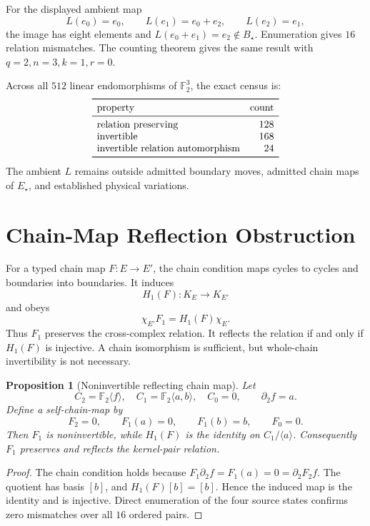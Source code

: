 \documentclass[11pt]{article}
\newtheorem{proposition}{Proposition}
\newcommand{\Ftwo}{\mathbb F_2}
\begin{document}
For the displayed ambient map
\[
L(e_0)=e_0,\qquad L(e_1)=e_0+e_2,\qquad L(e_2)=e_1,
\]
the image has eight elements and \(L(e_0+e_1)=e_2\notin B_\star\).
Enumeration gives \(16\) relation mismatches. The counting theorem gives the
same result with \(q=2,n=3,k=1,r=0\).

Across all \(512\) linear endomorphisms of \(\Ftwo^3\), the exact census is:
\[
\begin{array}{lr}
\toprule
\text{property}&\text{count}\\
\midrule
\text{relation preserving}&128\\
\text{invertible}&168\\
\text{invertible relation automorphism}&24\\
\bottomrule
\end{array}
\]
The ambient \(L\) remains outside admitted boundary moves, admitted chain
maps of \(E_\star\), and established physical variations.

\section{Chain-Map Reflection Obstruction}

For a typed chain map \(F:E\to E'\), the chain condition maps cycles to
cycles and boundaries into boundaries. It induces
\[
H_1(F):K_E\to K_{E'}
\]
and obeys
\[
\chi_{E'}F_1=H_1(F)\chi_E.
\]
Thus \(F_1\) preserves the cross-complex relation. It reflects the relation
if and only if \(H_1(F)\) is injective. A chain isomorphism is sufficient, but
whole-chain invertibility is not necessary.

\begin{proposition}[Noninvertible reflecting chain map]
Let
\[
C_2=\Ftwo\langle f\rangle,\quad
C_1=\Ftwo\langle a,b\rangle,\quad C_0=0,\qquad
\partial_2f=a.
\]
Define a self-chain-map by
\[
F_2=0,\qquad F_1(a)=0,\qquad F_1(b)=b,\qquad F_0=0.
\]
Then \(F_1\) is noninvertible, while \(H_1(F)\) is the identity on
\(C_1/\langle a\rangle\). Consequently \(F_1\) preserves and reflects the
kernel-pair relation.
\end{proposition}

\begin{proof}
The chain condition holds because
\(F_1\partial_2f=F_1(a)=0=\partial_2F_2f\).
The quotient has basis \([b]\), and \(H_1(F)[b]=[b]\). Hence the induced map is
the identity and is injective. Direct enumeration of the four source states
confirms zero mismatches over all \(16\) ordered pairs.
\end{proof}
\end{document}
